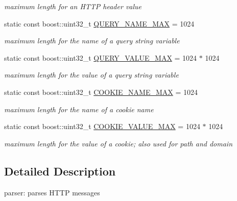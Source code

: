\begin{DoxyCompactItemize}
\begin{DoxyCompactList}\small\item\em maximum length for an H\-T\-T\-P header value \end{DoxyCompactList}\item 
static const boost\-::uint32\-\_\-t \hyperlink{classpion_1_1http_1_1parser_a730afd8438cd3c179bafc7d9eaad27b6}{Q\-U\-E\-R\-Y\-\_\-\-N\-A\-M\-E\-\_\-\-M\-A\-X} = 1024
\begin{DoxyCompactList}\small\item\em maximum length for the name of a query string variable \end{DoxyCompactList}\item 
static const boost\-::uint32\-\_\-t \hyperlink{classpion_1_1http_1_1parser_a5b0039834377ba6797d6628acf59f240}{Q\-U\-E\-R\-Y\-\_\-\-V\-A\-L\-U\-E\-\_\-\-M\-A\-X} = 1024 $\ast$ 1024
\begin{DoxyCompactList}\small\item\em maximum length for the value of a query string variable \end{DoxyCompactList}\item 
static const boost\-::uint32\-\_\-t \hyperlink{classpion_1_1http_1_1parser_a12cb4b88d7debd8467cc9de786721be2}{C\-O\-O\-K\-I\-E\-\_\-\-N\-A\-M\-E\-\_\-\-M\-A\-X} = 1024
\begin{DoxyCompactList}\small\item\em maximum length for the name of a cookie name \end{DoxyCompactList}\item 
static const boost\-::uint32\-\_\-t \hyperlink{classpion_1_1http_1_1parser_a50ae5c379ee3ad611fa6874bfcd8ed83}{C\-O\-O\-K\-I\-E\-\_\-\-V\-A\-L\-U\-E\-\_\-\-M\-A\-X} = 1024 $\ast$ 1024
\begin{DoxyCompactList}\small\item\em maximum length for the value of a cookie; also used for path and domain \end{DoxyCompactList}\end{DoxyCompactItemize}


\subsection{Detailed Description}
parser\-: parses H\-T\-T\-P messages 

